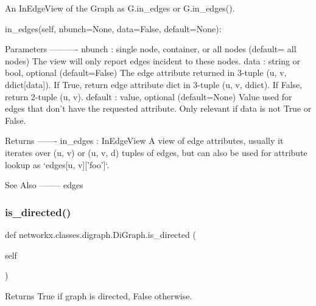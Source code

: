 \begin{DoxyVerb}An InEdgeView of the Graph as G.in_edges or G.in_edges().

in_edges(self, nbunch=None, data=False, default=None):

Parameters
----------
nbunch : single node, container, or all nodes (default= all nodes)
    The view will only report edges incident to these nodes.
data : string or bool, optional (default=False)
    The edge attribute returned in 3-tuple (u, v, ddict[data]).
    If True, return edge attribute dict in 3-tuple (u, v, ddict).
    If False, return 2-tuple (u, v).
default : value, optional (default=None)
    Value used for edges that don't have the requested attribute.
    Only relevant if data is not True or False.

Returns
-------
in_edges : InEdgeView
    A view of edge attributes, usually it iterates over (u, v)
    or (u, v, d) tuples of edges, but can also be used for
    attribute lookup as `edges[u, v]['foo']`.

See Also
--------
edges
\end{DoxyVerb}
 \mbox{\label{classnetworkx_1_1classes_1_1digraph_1_1DiGraph_a927903698c9c6780c965ee39da9bc8cb}} 
\subsubsection{\texorpdfstring{is\+\_\+directed()}{is\_directed()}}
{\footnotesize\ttfamily def networkx.\+classes.\+digraph.\+Di\+Graph.\+is\+\_\+directed (\begin{DoxyParamCaption}\item[{}]{self }\end{DoxyParamCaption})}

\begin{DoxyVerb}Returns True if graph is directed, False otherwise.\end{DoxyVerb}
 \mbox{\label{classnetworkx_1_1classes_1_1digraph_1_1DiGraph_ae07a320259a073de16fb41614f6955df}} 
